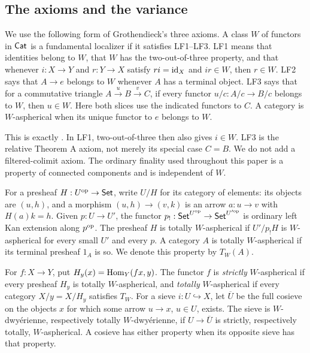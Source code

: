 \subsection{The axioms and the variance}

\begin{definition}\label{A:localizer}
We use the following form of Grothendieck's three axioms. A class $W$ of functors in $\mathsf{Cat}$ is a fundamental localizer if it satisfies LF1--LF3. LF1 means that identities belong to $W$, that $W$ has the two-out-of-three property, and that whenever $i:X\to Y$ and $r:Y\to X$ satisfy $ri=\mathrm{id}_X$ and $ir\in W$, then $r\in W$. LF2 says that $A\to e$ belongs to $W$ whenever $A$ has a terminal object. LF3 says that for a commutative triangle $A\xrightarrow{u}B\xrightarrow{v}C$, if every functor $u/c:A/c\to B/c$ belongs to $W$, then $u\in W$. Here both slices use the indicated functors to $C$. A category is $W$-aspherical when its unique functor to $e$ belongs to $W$.
\end{definition}

This is exactly \citet[Definitions 1.1.1 and 1.1.3]{Cisinski2004Minimal}. In LF1, two-out-of-three then also gives $i\in W$. LF3 is the relative Theorem A axiom, not merely its special case $C=B$. We do not add a filtered-colimit axiom. The ordinary finality used throughout this paper is a property of connected components and is independent of $W$.

\begin{definition}\label{A:definitions}
For a presheaf $H:U^{\mathrm{op}}\to\mathsf{Set}$, write $U/H$ for its category of elements: its objects are $(u,h)$, and a morphism $(u,h)\to(v,k)$ is an arrow $a:u\to v$ with $H(a)k=h$. Given $p:U\to U'$, the functor $p_!:\mathsf{Set}^{U^{\mathrm{op}}}\to\mathsf{Set}^{U'^{\mathrm{op}}}$ is ordinary left Kan extension along $p^{\mathrm{op}}$. The presheaf $H$ is totally $W$-aspherical if $U'/p_!H$ is $W$-aspherical for every small $U'$ and every $p$. A category $A$ is totally $W$-aspherical if its terminal presheaf $1_A$ is so. We denote this property by $T_W(A)$.

For $f:X\to Y$, put $H_y(x)=\operatorname{Hom}_Y(fx,y)$. The functor $f$ is \emph{strictly} $W$-aspherical if every presheaf $H_y$ is totally $W$-aspherical, and \emph{totally} $W$-aspherical if every category $X/y=X/H_y$ satisfies $T_W$. For a sieve $i:U\hookrightarrow X$, let $\overline U$ be the full cosieve on the objects $x$ for which some arrow $u\to x$, $u\in U$, exists. The sieve is $W$-dwy\'erienne, respectively totally $W$-dwy\'erienne, if $U\to\overline U$ is strictly, respectively totally, $W$-aspherical. A cosieve has either property when its opposite sieve has that property.
\end{definition}

